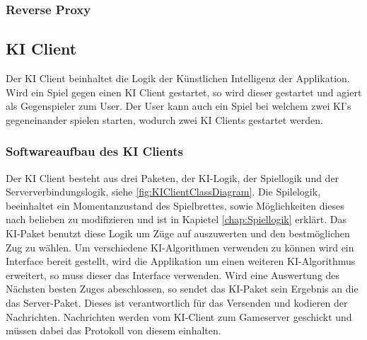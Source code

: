 \documentclass[12pt,a4paper,bibliography=totocnumbered,listof=totocnumbered]{article}
\begin{document}
\subsubsection{Reverse Proxy}

\subsection{KI Client}
Der KI Client beinhaltet die Logik der Künstlichen Intelligenz der Applikation. Wird ein Spiel gegen einen KI Client gestartet, so wird dieser gestartet und agiert als 
Gegenspieler zum User. Der User kann auch ein Spiel bei welchem zwei KI's gegeneinander spielen starten, wodurch zwei KI Clients gestartet werden.

\subsubsection{Softwareaufbau des KI Clients}
Der KI Client besteht aus drei Paketen, der KI-Logik, der Spiellogik und der Serververbindungslogik, siehe \ref{fig:KIClientClassDiagram}. 
Die Spilelogik, beeinhaltet ein Momentanzustand des Spielbrettes, sowie Möglichkeiten dieses nach belieben zu modifizieren und ist in Kapietel 
\ref{chap:Spiellogik} erklärt. Das KI-Paket benutzt diese Logik um 
Züge auf auszuwerten und den bestmöglichen Zug zu wählen. Um verschiedene KI-Algorithmen verwenden zu können wird ein Interface bereit gestellt, wird die Applikation 
um einen weiteren KI-Algorithmus erweitert, so muss dieser das Interface verwenden. Wird eine Auswertung des Nächsten besten Zuges abeschlossen, so sendet das KI-Paket sein
Ergebnis an die das Server-Paket. Dieses ist verantwortlich für das Versenden und kodieren der Nachrichten. Nachrichten werden vom KI-Client zum Gameserver geschickt und müssen
dabei das Protokoll von diesem einhalten.
\end{document}

